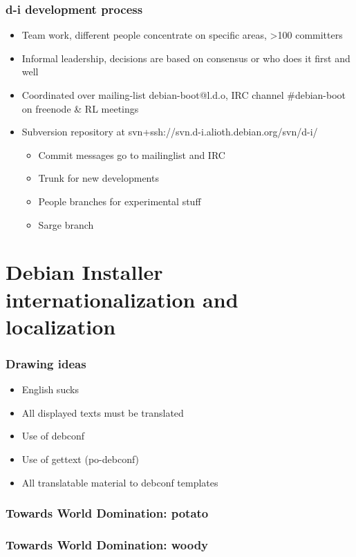 \documentclass{beamer}
\begin{document}
\begin{frame}
  \frametitle{d-i development process}
	\begin{itemize}
	\item<1->
		Team work, different people concentrate on specific areas, >100 committers
	\item<1->
		Informal leadership, decisions are based on consensus or who does it first and well
	\item<1->
		Coordinated over mailing-list debian-boot@l.d.o, IRC channel \#debian-boot on freenode \& RL meetings 
	\item<2->
		Subversion repository at svn+ssh://svn.d-i.alioth.debian.org/svn/d-i/
		\begin{itemize}[<+->]
			\item<2->
				Commit messages go to mailinglist and IRC
			\item<2->
				Trunk for new developments
			\item<2->
				People branches for experimental stuff
			\item<2->
				Sarge branch
		\end{itemize}
	\end{itemize}
\end{frame}



\section{Debian Installer internationalization and localization}

\begin{frame}
  \frametitle{Drawing ideas}
	\begin{itemize}
	\item<2->
		English sucks
	\item<3->
		All displayed texts must be translated
	\item<4->
		Use of debconf
	\item<5->
		Use of gettext (po-debconf)
	\item<6->
		All translatable material to debconf templates
	\end{itemize}
\end{frame}

\begin{frame}
  \frametitle{Towards World Domination: potato}
\end{frame}

\begin{frame}
  \frametitle{Towards World Domination: woody}
\end{frame}
\end{document}
